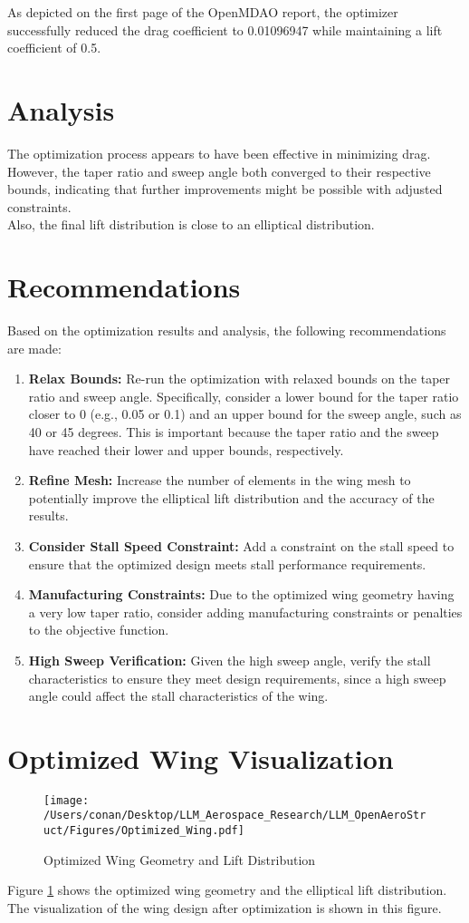 \documentclass{article}
\begin{document}
As depicted on the first page of the OpenMDAO report, the optimizer successfully reduced the drag coefficient to 0.01096947 while maintaining a lift coefficient of 0.5.

\section{Analysis}
The optimization process appears to have been effective in minimizing drag. However, the taper ratio and sweep angle both converged to their respective bounds, indicating that further improvements might be possible with adjusted constraints. \\ Also, the final lift distribution is close to an elliptical distribution.

\section{Recommendations}
Based on the optimization results and analysis, the following recommendations are made:

\begin{enumerate}
    \item \textbf{Relax Bounds:} Re-run the optimization with relaxed bounds on the taper ratio and sweep angle. Specifically, consider a lower bound for the taper ratio closer to 0 (e.g., 0.05 or 0.1) and an upper bound for the sweep angle, such as 40 or 45 degrees. This is important because the taper ratio and the sweep have reached their lower and upper bounds, respectively.
    \item \textbf{Refine Mesh:} Increase the number of elements in the wing mesh to potentially improve the elliptical lift distribution and the accuracy of the results.
    \item \textbf{Consider Stall Speed Constraint:} Add a constraint on the stall speed to ensure that the optimized design meets stall performance requirements.
    \item \textbf{Manufacturing Constraints:} Due to the optimized wing geometry having a very low taper ratio, consider adding manufacturing constraints or penalties to the objective function.
    \item \textbf{High Sweep Verification:} Given the high sweep angle, verify the stall characteristics to ensure they meet design requirements, since a high sweep angle could affect the stall characteristics of the wing.
\end{enumerate}

\section{Optimized Wing Visualization}
\begin{figure}[h!]
    \centering
    \texttt{[image: /Users/conan/Desktop/LLM\_Aerospace\_Research/LLM\_OpenAeroStruct/Figures/Optimized\_Wing.pdf]}
    \caption{Optimized Wing Geometry and Lift Distribution}
    \label{fig:optimized_wing}
\end{figure}

Figure \ref{fig:optimized_wing} shows the optimized wing geometry and the elliptical lift distribution. The visualization of the wing design after optimization is shown in this figure.
\end{document}
